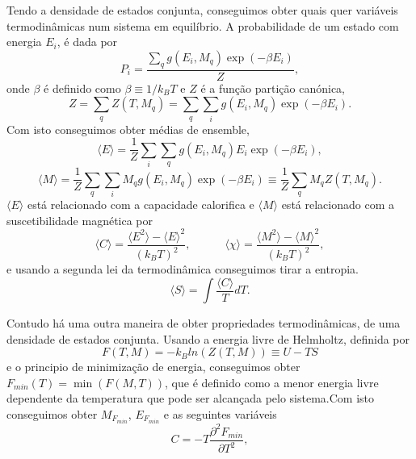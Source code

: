 \documentclass[12pt, a4paper]{article}
\begin{document}
	Tendo a densidade de estados conjunta, conseguimos obter quais quer variáveis termodinâmicas num sistema em equilíbrio. 
	A probabilidade de um estado com energia $E_i$, é dada por
\begin{equation}
	P_i = \frac{\sum_q g(E_i, M_q) \exp(-\beta E_i)}{Z},
\end{equation}
onde $\beta$ é definido como $\beta \equiv 1/k_BT$ e $Z$ é a função partição canónica, 
\begin{equation}
	Z = \sum_q Z(T, M_q) = \sum_q \sum_i g(E_i, M_q) \exp(-\beta E_i).
\end{equation}
Com isto conseguimos obter médias de ensemble, 
\begin{equation}
	\langle E \rangle = \frac{1}{Z} \sum_i \sum_q  g(E_i, M_q) E_i \exp(-\beta E_i),
\end{equation}
\begin{equation}
	\langle M \rangle  = \frac{1}{Z} \sum_q \sum_i M_q g(E_i, M_q) \exp(-\beta E_i) \equiv \frac{1}{Z} \sum_q M_q Z(T, M_q).
\end{equation}
$\langle E \rangle$ está relacionado com a capacidade calorifica e $\langle M \rangle$ está relacionado com a suscetibilidade magnética por 
\begin{equation}
	\langle C \rangle = \frac{\langle E^2 \rangle - \langle E \rangle^2}{\left( k_BT \right)^2}, \quad \quad \quad 
	\langle \chi \rangle = \frac{\langle M^2 \rangle - \langle M \rangle^2}{\left( k_BT \right)^2},
\end{equation}
e usando a segunda lei da termodinâmica conseguimos tirar a entropia.
\begin{equation}
	\langle S \rangle= \int \frac{\langle C \rangle}{T} dT.
\end{equation}

	Contudo há uma outra maneira de obter propriedades termodinâmicas, de uma densidade de estados conjunta. Usando a energia livre de Helmholtz, definida por 
\begin{equation}
	F(T, M) = - k_B ln(Z(T, M)) \equiv U - TS
\end{equation}
e o principio de minimização de energia, conseguimos obter $F_{min} (T) = \min(F(M, T))$, que é definido como a menor energia livre dependente da temperatura que pode ser alcançada pelo sistema.Com isto conseguimos obter $M_{F_{min}}$, $E_{F_{min}}$ e as seguintes variáveis
\begin{equation}
	C = - T \frac{\partial^2 F_{min}}{\partial T^2},
\end{equation}
\end{document}

